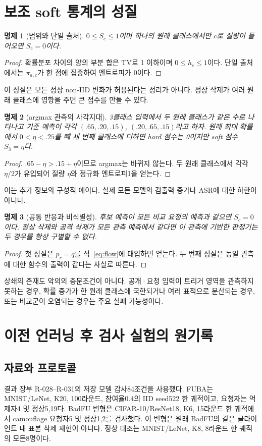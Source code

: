 \documentclass[10pt,a4paper]{article}
\newtheorem{proposition}{명제}
\begin{document}
\section{보조 soft 통계의 성질}
\begin{proposition}[범위와 단일 출처]
$0\le S_c\le1$이며 하나의 원래 클래스에서만 $c$로 질량이 들어오면 $S_c=0$이다.
\end{proposition}
\begin{proof}
확률분포 차이의 양의 부분 합은 TV로 1 이하이며 $0\le h_c\le1$이다.
단일 출처에서는 $\pi_{a,c}$가 한 점에 집중하여 엔트로피가 0이다.
\end{proof}
이 성질은 모든 정상 non-IID 변화가 허용된다는 정리가 아니다.
정상 삭제가 여러 원래 클래스에 영향을 주면 큰 점수를 만들 수 있다.

\begin{proposition}[argmax 관측의 사각지대]
3클래스 입력에서 두 원래 클래스가 같은 수로 나타나고 기준 예측이 각각
$(.65,.20,.15)$, $(.20,.65,.15)$라고 하자.
원래 최대 확률에서 $0<\eta<.25$를 빼 세 번째 클래스에 더하면
hard 점수는 0이지만 soft 점수 $S_3=\eta$다.
\end{proposition}
\begin{proof}
$.65-\eta>.15+\eta$이므로 argmax는 바뀌지 않는다.
두 원래 클래스에서 각각 $\eta/2$가 유입되어 질량 $\eta$와 정규화 엔트로피1을 얻는다.
\end{proof}
이는 추가 정보의 구성적 예이다. 실제 모든 모델의 검출력 증가나 ASR에 대한 하한이 아니다.

\begin{proposition}[공통 반응과 비식별성]
후보 예측이 모든 비교 요청의 예측과 같으면 $S_c=0$이다.
정상 삭제와 공격 삭제가 모든 관측 예측에서 같다면 이 관측에 기반한 판정기는
두 경우를 항상 구별할 수 없다.
\end{proposition}
\begin{proof}
첫 성질은 $p_r=q$를 식~\eqref{eq:flow}에 대입하면 얻는다.
두 번째 성질은 동일 관측에 대한 함수의 출력이 같다는 사실로 따른다.
\end{proof}
상쇄의 존재도 악의의 충분조건이 아니다. 공개·요청 입력이 트리거 영역을 관측하지 못하는 경우,
확률 증가가 한 원래 클래스에 국한되거나 여러 표적으로 분산되는 경우,
또는 비교군이 오염되는 경우는 주요 실패 가능성이다.

\section{이전 언러닝 후 검사 실험의 원기록}
\subsection{자료와 프로토콜}
결과 장부 R-028--R-031의 저장 모델 감사84조건을 사용했다.
FUBA는 MNIST/LeNet, K20, 100라운드, 참여율0.4의 IID seed522 한 궤적이고,
요청자는 억제자4 및 정상5,19다. BadFU 변형은 CIFAR-10/ResNet18,
K6, 15라운드 한 궤적에서 camouflage 요청자5 및 정상1,2를 검사했다.
이 변형은 원래 BadFU의 같은 클라이언트 내 표본 삭제 재현이 아니다.
정상 대조는 MNIST/LeNet, K8, 8라운드 한 궤적의 모든8명이다.
\end{document}
